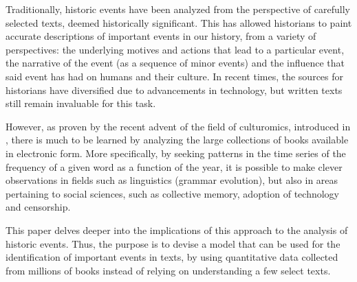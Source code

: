 
Traditionally, historic events have been analyzed from the perspective of carefully selected texts, deemed historically significant. This has allowed historians to paint accurate descriptions of important events in our history, from a variety of perspectives: the underlying motives and actions that lead to a particular event, the narrative of the event (as a sequence of minor events) and the influence that said event has had on humans and their culture. In recent times, the sources for historians have diversified due to advancements in technology, but written texts still remain invaluable for this task.

However, as proven by the recent advent of the field of culturomics, introduced in , there is much to be learned by analyzing the large collections of books available in electronic form. More specifically, by seeking patterns in the time series of the frequency of a given word as a function of the year, it is possible to make clever observations in fields such as linguistics (grammar evolution), but also in areas pertaining to social sciences, such as collective memory, adoption of technology and censorship.

This paper delves deeper into the implications of this approach to the analysis of historic events. Thus, the purpose is to devise a model that can be used for the identification of important events in texts, by using quantitative data collected from millions of books instead of relying on understanding a few select texts.
